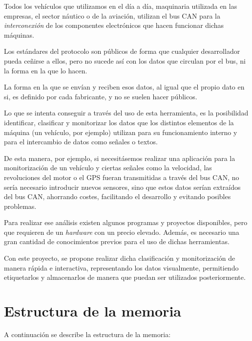 
Todos los vehículos que utilizamos en el día a día, maquinaria utilizada en las empresas, el sector náutico o de la aviación, utilizan el bus CAN para la \emph{interconexión} de los componentes electrónicos que hacen funcionar dichas máquinas.

Los estándares del protocolo son públicos de forma que cualquier desarrollador pueda ceñirse a ellos, pero no sucede así con los datos que circulan por el bus, ni la forma en la que lo hacen.

La forma en la que se envían y reciben esos datos, al igual que el propio dato en si, es definido por cada fabricante, y no se suelen hacer públicos.

Lo que se intenta conseguir a través del uso de esta herramienta, es la posibilidad identificar, clasificar y monitorizar los datos que los distintos elementos de la máquina (un vehículo, por ejemplo) utilizan para su funcionamiento interno y para el intercambio de datos como señales o textos.

De esta manera, por ejemplo, si necesitásemos realizar una aplicación para la monitorización de un vehículo y ciertas señales como la velocidad, las revoluciones del motor o el GPS fueran transmitidas a través del bus CAN, no sería necesario introducir nuevos sensores, sino que estos datos serían extraídos del bus CAN, ahorrando costes, facilitando el desarrollo y evitando posibles problemas.


Para realizar ese análisis existen algunos programas y proyectos disponibles, pero que requieren de un \emph{hardware} con un precio elevado. Además, es necesario una gran cantidad de conocimientos previos para el uso de dichas herramientas.

Con este proyecto, se propone realizar dicha clasificación y monitorización de manera rápida e interactiva, representando los datos visualmente, permitiendo etiquetarlos y almacenarlos de manera que puedan ser utilizados posteriormente.

\section{Estructura de la memoria}\label{estructura-de-la-memoria}

A continuación se describe la estructura de la memoria:


